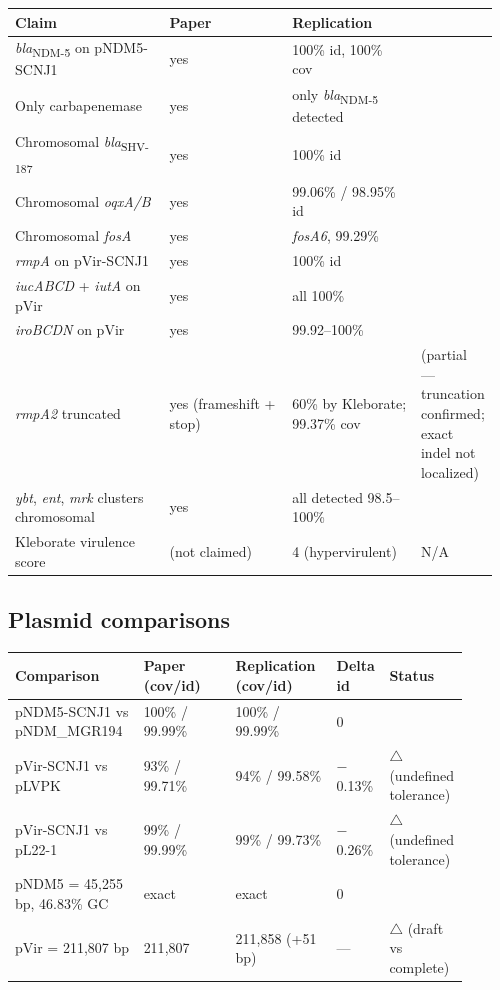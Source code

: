 \documentclass[11pt,letterpaper]{article}
\newcommand{\vok}{\textcolor{green!50!black}{\checkmark}}
\newcommand{\vwarn}{\textcolor{orange!80!black}{$\triangle$}}
\begin{document}
\begin{longtable}{@{}p{0.35\linewidth} p{0.28\linewidth} p{0.28\linewidth} p{0.05\linewidth}@{}}
\toprule
\textbf{Claim} & \textbf{Paper} & \textbf{Replication} & \textbf{}\\
\midrule
\endfirsthead
\textit{bla}\textsubscript{NDM-5} on pNDM5-SCNJ1 & yes & 100\% id, 100\% cov & \vok \\
Only carbapenemase & yes & only \textit{bla}\textsubscript{NDM-5} detected & \vok \\
Chromosomal \textit{bla}\textsubscript{SHV-187} & yes & 100\% id & \vok \\
Chromosomal \textit{oqxA/B} & yes & 99.06\% / 98.95\% id & \vok \\
Chromosomal \textit{fosA} & yes & \textit{fosA6}, 99.29\% & \vok \\
\textit{rmpA} on pVir-SCNJ1 & yes & 100\% id & \vok \\
\textit{iucABCD} + \textit{iutA} on pVir & yes & all 100\% & \vok \\
\textit{iroBCDN} on pVir & yes & 99.92--100\% & \vok \\
\textit{rmpA2} truncated & yes (frameshift + stop) & 60\% by Kleborate; 99.37\% cov & \vok{} (partial --- truncation confirmed; exact indel not localized) \\
\textit{ybt}, \textit{ent}, \textit{mrk} clusters chromosomal & yes & all detected 98.5--100\% & \vok \\
Kleborate virulence score & (not claimed) & 4 (hypervirulent) & N/A \\
\bottomrule
\end{longtable}

\subsection{Plasmid comparisons}

\begin{longtable}{@{}p{0.28\linewidth} p{0.20\linewidth} p{0.22\linewidth} p{0.10\linewidth} p{0.10\linewidth}@{}}
\toprule
\textbf{Comparison} & \textbf{Paper (cov/id)} & \textbf{Replication (cov/id)} & \textbf{Delta id} & \textbf{Status} \\
\midrule
\endfirsthead
pNDM5-SCNJ1 vs pNDM\_MGR194 & 100\% / 99.99\% & 100\% / 99.99\% & 0 & \vok \\
pVir-SCNJ1 vs pLVPK & 93\% / 99.71\% & 94\% / 99.58\% & $-$0.13\% & \vwarn{} (undefined tolerance) \\
pVir-SCNJ1 vs pL22-1 & 99\% / 99.99\% & 99\% / 99.73\% & $-$0.26\% & \vwarn{} (undefined tolerance) \\
pNDM5 = 45{,}255 bp, 46.83\% GC & exact & exact & 0 & \vok \\
pVir = 211{,}807 bp & 211{,}807 & 211{,}858 (+51 bp) & --- & \vwarn{} (draft vs complete) \\
\bottomrule
\end{longtable}
\end{document}
